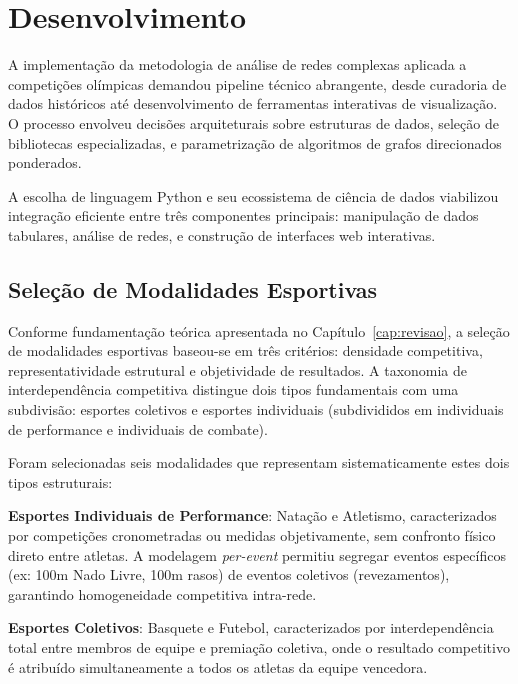 \chapter{Desenvolvimento}
\label{cap:desenvolvimento}

A implementação da metodologia de análise de redes complexas aplicada a competições olímpicas demandou pipeline técnico abrangente, desde curadoria de dados históricos até desenvolvimento de ferramentas interativas de visualização. O processo envolveu decisões arquiteturais sobre estruturas de dados, seleção de bibliotecas especializadas, e parametrização de algoritmos de grafos direcionados ponderados.

A escolha de linguagem Python e seu ecossistema de ciência de dados viabilizou integração eficiente entre três componentes principais: manipulação de dados tabulares, análise de redes, e construção de interfaces web interativas.

\section{Seleção de Modalidades Esportivas}

Conforme fundamentação teórica apresentada no Capítulo~\ref{cap:revisao}, a seleção de modalidades esportivas baseou-se em três critérios: densidade competitiva, representatividade estrutural e objetividade de resultados. A taxonomia de interdependência competitiva distingue dois tipos fundamentais com uma subdivisão: esportes coletivos e esportes individuais (subdivididos em individuais de performance e individuais de combate).

Foram selecionadas seis modalidades que representam sistematicamente estes dois tipos estruturais:

\textbf{Esportes Individuais de Performance}: Natação e Atletismo, caracterizados por competições cronometradas ou medidas objetivamente, sem confronto físico direto entre atletas. A modelagem \textit{per-event} permitiu segregar eventos específicos (ex: 100m Nado Livre, 100m rasos) de eventos coletivos (revezamentos), garantindo homogeneidade competitiva intra-rede.

\textbf{Esportes Coletivos}: Basquete e Futebol, caracterizados por interdependência total entre membros de equipe e premiação coletiva, onde o resultado competitivo é atribuído simultaneamente a todos os atletas da equipe vencedora.

